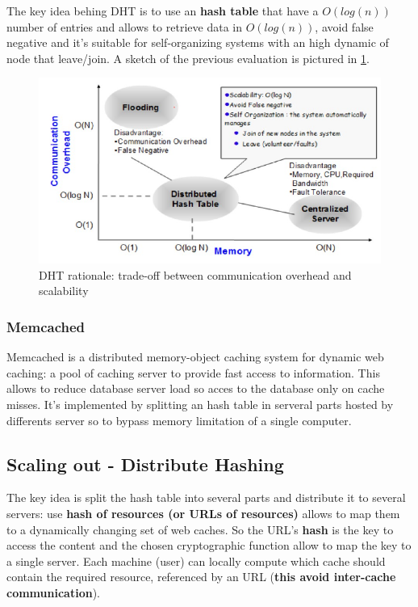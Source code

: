 \documentclass[10pt,a4paper]{report}
\begin{document}
The key idea behing DHT is to use an \textbf{hash table} that have a $O(log(n))$ number of entries and allows to retrieve data in $O(log(n))$, avoid false negative and it's suitable for self-organizing systems with an high dynamic of node that leave/join. A sketch of the previous evaluation is pictured in \ref{dht-diagram-rationale}.

\begin{figure}[h]
 	\centering
	\includegraphics[scale=0.60]{images/Pasted image 20230301120652.png}
	\caption{DHT rationale: trade-off between communication overhead and scalability}
	\label{dht-diagram-rationale}
\end{figure}

\subsubsection{Memcached}\label{sec:memcached}
Memcached is a distributed memory-object caching system for dynamic web caching: a pool of caching server to provide fast access to information. This allows to reduce database server load so acces to the database only on cache misses. It's implemented by splitting an hash table in serveral parts hosted by differents server so to bypass memory limitation of a single computer.
\subsection{Scaling out - Distribute Hashing}\label{sec:scaling-out---distribute-hashing}
The key idea is split the hash table into several parts and distribute it to several servers: use \textbf{hash of resources (or URLs of resources)} allows to map them to a dynamically changing set of web caches. So the URL's \textbf{hash} is the key to access the content and the chosen cryptographic function allow to map the key to a single server. Each machine (user) can locally compute which cache should contain the required resource, referenced by an URL (\textbf{this avoid inter-cache communication}).
\end{document}
